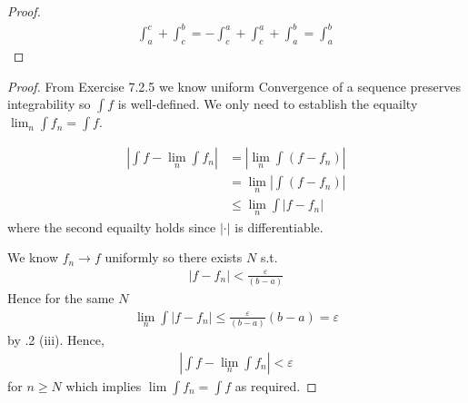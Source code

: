 \begin{proof}
    \begin{align*}
        \int_a^c+\int_c^b = -\int_c^a + \int_c^a + \int_a^b = \int_a^b
    \end{align*}
\end{proof}

\begin{proof}
    From Exercise 7.2.5 we know uniform Convergence of a sequence 
    preserves integrability so $\int f$ is well-defined.
    We only need to establish the equailty $\lim_n \int f_n = \int f$.

    \begin{align*}
        |\int f - \lim_n \int f_n| &= |\lim_n \int (f -  f_n)| \\
        &= \lim_n |\int (f-f_n)| \\
        &\leq \lim_n \int |f-f_n|
    \end{align*}
    where the second equailty holds since $|\cdot|$ is differentiable.

    We know $f_n\rightarrow f$ uniformly so there exists $N$
    s.t. 
    \begin{align*}
        |f-f_n| < \frac{\varepsilon}{(b-a)}
    \end{align*}
    Hence for the same $N$
    \begin{align*}
        \lim_n \int |f-f_n| \leq \frac{\varepsilon}{(b-a)}(b-a) = \varepsilon
    \end{align*}
    by .2 (iii).
    Hence, 
    \begin{align*}
        |\int f - \lim_n \int f_n| < \varepsilon
    \end{align*}
    for $n\geq N$ which implies $\lim \int f_n = \int f$ as required.
\end{proof}

